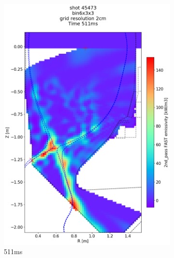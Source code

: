 \begin{figure}
\begin{subfigure}{0.395\linewidth}
         \includegraphics[trim={75 90 0 190},clip,width=\textwidth]{Chapters/chapter2/figs/IRVB-MASTU_shot-45473_export_73.png}
         \vspace*{-6.5mm}
         \caption{511ms}
         \label{fig:45473_export2_2}
     \end{subfigure}
     \begin{subfigure}{0.395\linewidth}
         \centering

\end{subfigure}
\end{figure}
